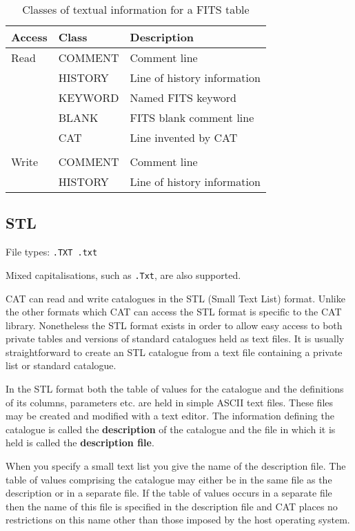 \begin{table}[htbp]

\begin{center}
\begin{tabular}{lll}
Access & Class    & Description   \\ \hline
Read   & COMMENT  & Comment line  \\
       & HISTORY  & Line of history information \\
       & KEYWORD  & Named FITS keyword  \\
       & BLANK    & FITS blank comment line  \\
       & CAT      & Line invented by CAT \\
       &          & \\
Write  & COMMENT  & Comment line  \\
       & HISTORY  & Line of history information \\
\end{tabular}
\end{center}

\caption{\label{FITS_TEXT}Classes of textual information for a FITS table}

\end{table}


\subsection{STL}

File types: {\tt .TXT  .txt}

Mixed capitalisations, such as {\tt .Txt}, are also supported.

CAT can read and write catalogues in the STL (Small Text List) format.
Unlike the other formats which CAT can access the STL format is specific
to the CAT library.  Nonetheless the STL format exists in order to allow
easy access to both private tables and versions of standard catalogues
held as text files.  It is usually straightforward to create an STL
catalogue from a text file containing a private list or standard catalogue.

In the STL format both the table of values for the catalogue and the
definitions of its columns, parameters etc. are held in simple ASCII
text files.  These files may be created and modified with a text editor.
The information defining the catalogue is called the {\bf description} of
the catalogue and the file in which it is held is called the {\bf
description file}.

When you specify a small text list you give the name of the description
file.  The table of values comprising the catalogue may either be in the
same file as the description or in a separate file.  If the table of values
occurs in a separate file then the name of this file is specified in the
description file and CAT places no restrictions on this name other than
those imposed by the host operating system.

